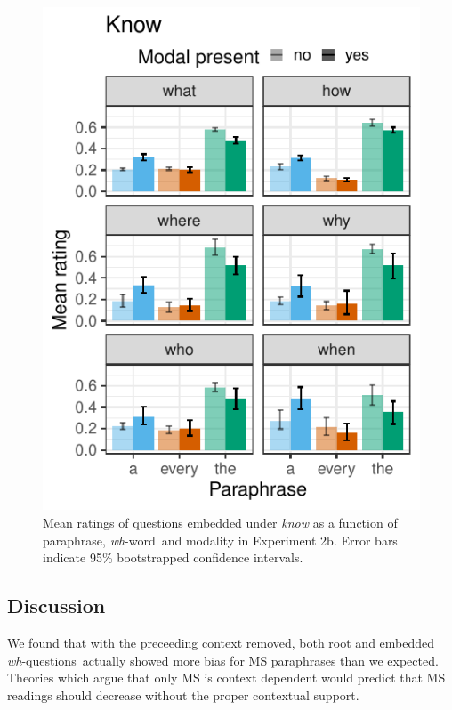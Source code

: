 \documentclass[12pt,letterpaper,table,svgnames,dvipsnames]{article}
\newcommand{\whqs}{\emph{wh}-questions~}
\newcommand{\whw}{\emph{wh}-word~}
\begin{document}
\begin{figure}[h!]
\centering
\includegraphics[scale=1]{figures/modwh_know_nocontext.pdf}
\caption{Mean ratings of questions embedded under \emph{know} as a function of paraphrase, \whw and modality in Experiment 2b. Error bars indicate 95\% bootstrapped confidence intervals.} 
\label{ex2b_know_modXwh}
\end{figure}


\subsection{Discussion}
We found that with the preceeding context removed, both root and embedded \whqs actually showed more bias for MS paraphrases than we expected. Theories which argue that only MS is context dependent would predict that MS readings should decrease without the proper contextual support. 
\end{document}
